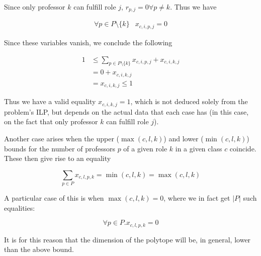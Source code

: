 Since only professor $k$ can fulfill role $j$, $r_{p, j} = 0 \forall p \ne k$. Thus we have

\begin{align*}
\forall p \in P \setminus \{k\} & x_{c, i, p, j} = 0
\end{align*}

Since these variables vanish, we conclude the following

\begin{align*}
1 &\le \sum_{p \in P \setminus \{k\}} x_{c, i, p, j} + x_{c, i, k, j}\\
  &= 0 + x_{c, i, k, j}\\
  &= x_{c, i, k, j} \le 1
\end{align*}

Thus we have a valid equality $x_{c, i, k, j} = 1$, which is not deduced solely from the problem's ILP, but depends on the actual data that each case has (in this case, on the fact that only professor $k$ can fulfill role $j$).

Another case arises when the upper ($\max(c, l, k)$) and lower ($\min(c, l, k)$) bounds for the number of professors $p$ of a given role $k$ in a given class $c$ coincide. These then give rise to an equality

$$
\sum_{p \in P} x_{c, l, p, k} = \min(c, l, k) = \max(c, l, k)
$$

A particular case of this is when $\max(c, l, k) = 0$, where we in fact get $|P|$ such equalities:

$$
\forall p \in P. x_{c, l, p, k} = 0
$$

It is for this reason that the dimension of the polytope will be, in general, lower than the above bound.
